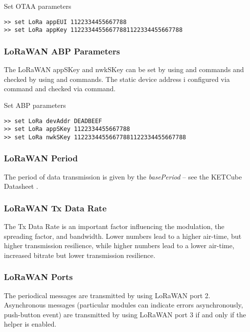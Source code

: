 \begin{docCodeExampleTitled}{Set OTAA parameters}
\begin{verbatim}
>> set LoRa appEUI 1122334455667788
>> set LoRa appKey 11223344556677881122334455667788
\end{verbatim}
\end{docCodeExampleTitled}
  
\subsubsection{LoRaWAN ABP Parameters}
The LoRaWAN appSKey and nwkSKey can be set by using  and  commands and checked by using  and  commands. The static device address i configured via   command and checked via   command.
  
\begin{docCodeExampleTitled}{Set ABP parameters}
\begin{verbatim}
>> set LoRa devAddr DEADBEEF
>> set LoRa appSKey 1122334455667788
>> set LoRa nwkSKey 11223344556677881122334455667788
\end{verbatim}
\end{docCodeExampleTitled}

\subsubsection{LoRaWAN Period}
The period of data transmission is given by the {\it basePeriod} -- see the KETCube Datasheet \cite{ZCU:KETCube:05-2018}.

\subsubsection{LoRaWAN Tx Data Rate}
The Tx Data Rate is an important factor influencing the modulation, the spreading factor, and bandwidth. Lower numbers lead to a higher air-time, but higher transmission resilience, while higher numbers lead to a lower air-time, increased bitrate but lower transmission resilience.

\subsubsection{LoRaWAN Ports}

  The periodical messages are transmitted by using LoRaWAN port 2. Asynchronous messages (particular modules can indicate errors asynchronously, push-button event) are transmitted by using LoRaWAN port 3 if and only if the helper  is enabled.
  
